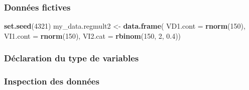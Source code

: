\documentclass[
]{book}
\newenvironment{Shaded}{\begin{snugshade}}{\end{snugshade}}
\newcommand{\DataTypeTok}[1]{\textcolor[rgb]{0.13,0.29,0.53}{#1}}
\newcommand{\DecValTok}[1]{\textcolor[rgb]{0.00,0.00,0.81}{#1}}
\newcommand{\FloatTok}[1]{\textcolor[rgb]{0.00,0.00,0.81}{#1}}
\newcommand{\KeywordTok}[1]{\textcolor[rgb]{0.13,0.29,0.53}{\textbf{#1}}}
\newcommand{\NormalTok}[1]{#1}
\newcommand{\OperatorTok}[1]{\textcolor[rgb]{0.81,0.36,0.00}{\textbf{#1}}}
\newcommand{\StringTok}[1]{\textcolor[rgb]{0.31,0.60,0.02}{#1}}
\begin{document}
\hypertarget{donnuxe9es-fictives-6}{%
\subsubsection{Données fictives}\label{donnuxe9es-fictives-6}}

\begin{Shaded}
\begin{Highlighting}[]
\KeywordTok{set.seed}\NormalTok{(}\DecValTok{4321}\NormalTok{)}
\NormalTok{my_data.regmult2 <-}\StringTok{ }\KeywordTok{data.frame}\NormalTok{(}
  \DataTypeTok{VD1.cont =} \KeywordTok{rnorm}\NormalTok{(}\DecValTok{150}\NormalTok{),}
  \DataTypeTok{VI1.cont =} \KeywordTok{rnorm}\NormalTok{(}\DecValTok{150}\NormalTok{),}
  \DataTypeTok{VI2.cat =} \KeywordTok{rbinom}\NormalTok{(}\DecValTok{150}\NormalTok{, }\DecValTok{2}\NormalTok{, }\FloatTok{0.4}\NormalTok{))}
\end{Highlighting}
\end{Shaded}

\hypertarget{duxe9claration-du-type-de-variables-5}{%
\subsubsection{Déclaration du type de variables}\label{duxe9claration-du-type-de-variables-5}}

\begin{Shaded}
\end{Shaded}

\hypertarget{inspection-des-donnuxe9es-5}{%
\subsubsection{Inspection des données}\label{inspection-des-donnuxe9es-5}}
\end{document}
